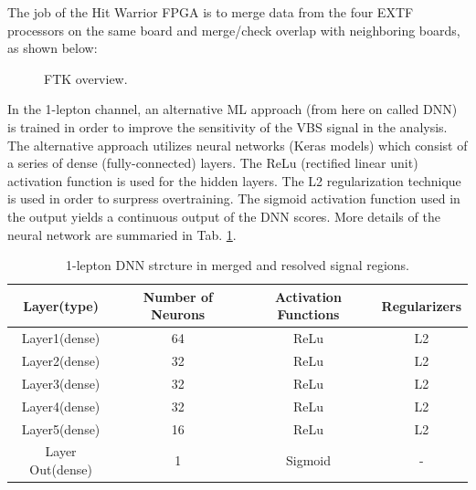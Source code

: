 The job of the Hit Warrior FPGA is to merge data from the four EXTF processors on the same board and merge/check overlap with neighboring boards, as shown below:
\begin{figure}[ht]
 \begin{center}
  \caption{FTK overview.}
 \label{fig:1lepDNNoutputs}
 \end{center}
\end{figure}









In the 1-lepton channel, an alternative ML approach (from here on called DNN) is trained in order to improve the sensitivity of the VBS signal in the analysis. The alternative approach utilizes neural networks (Keras models) which consist of a series of dense (fully-connected) layers. The ReLu (rectified linear unit) activation function is used for the hidden layers. The L2 regularization technique is used in order to surpress
overtraining. The sigmoid activation function used in the output yields a continuous output of the DNN scores.
More details of the neural network are summaried in Tab. \ref{tab:1lepDNN layers}.

\begin{table}[ht]
    \centering
    \begin{tabular}{c|c|c|c}
     Layer(type) & Number of Neurons & Activation Functions & Regularizers\\
     \hline
     \hline
     Layer1(dense) & 64 & ReLu & L2\\
     Layer2(dense) & 32 & ReLu & L2\\
     Layer3(dense) & 32 & ReLu & L2\\
     Layer4(dense) & 32 & ReLu & L2\\
     Layer5(dense) & 16 & ReLu & L2\\
     Layer Out(dense) & 1 & Sigmoid & -\\
    \end{tabular}
    \caption{1-lepton DNN strcture in merged and resolved signal regions.}
    \label{tab:1lepDNN layers}
\end{table}

